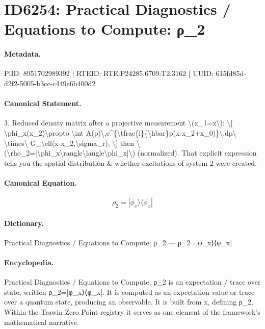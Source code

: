 \section*{ID6254: Practical Diagnostics / Equations to Compute: ρ\_2}
\paragraph{Metadata.}
PiID: 8951702989392 | RTEID: RTE:P24285.6709:T2.3162 | UUID: 615fd85d-d2f2-5005-b3cc-c449e6b400d2

\paragraph{Canonical Statement.}
3. Reduced density matrix after a projective measurement \textbackslash{}(x\_1=x\textbackslash{}): \textbackslash{}[ \textbackslash{}phi\_x(x\_2)\textbackslash{}propto \textbackslash{}int A(p)\textbackslash{},e\textasciicircum{}\{\textbackslash{}tfrac\{i\}\{\textbackslash{}hbar\}p(x-x\_2+x\_0)\}\textbackslash{},dp\textbackslash{} \textbackslash{}times\textbackslash{} G\_\textbackslash{}ell(x-x\_2,\textbackslash{}sigma\_r), \textbackslash{}] then \textbackslash{}(\textbackslash{}rho\_2=|\textbackslash{}phi\_x\textbackslash{}rangle\textbackslash{}langle\textbackslash{}phi\_x|\textbackslash{}) (normalized). That explicit expression tells you the spatial distribution \& whether excitations of system 2 were created.

\paragraph{Canonical Equation.}
\[
\rho_2=|\phi_x\rangle\langle\phi_x|
\]

\paragraph{Dictionary.}
Practical Diagnostics / Equations to Compute: ρ\_2 — ρ\_2=|φ\_x⟩⟨φ\_x|

\paragraph{Encyclopedia.}
Practical Diagnostics / Equations to Compute: ρ\_2 is an expectation / trace over state, written ρ\_2=|φ\_x⟩⟨φ\_x|. It is computed as an expectation value or trace over a quantum state, producing an observable. It is built from x, defining ρ\_2. Within the Trawin Zero Point registry it serves as one element of the framework's mathematical narrative.
